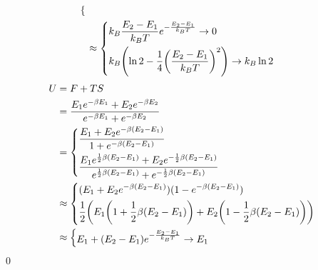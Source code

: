 \documentclass[uplatex,dvipdfmx,a4paper,11pt]{jlreq}
\makeatletter
\theoremstyle{definition}
\renewenvironment{proof}[1][\proofname]{\par
  \normalfont
  \topsep6\p@\@plus6\p@ \trivlist
  \item[\hskip\labelsep{\bfseries #1}\@addpunct{\bfseries}]\ignorespaces\quad\par
}{%
  \qed\endtrivlist\@endpefalse
}
\renewcommand\proofname{証明}
\makeatother
\begin{document}
\begin{proof}
\begin{align}
\begin{dcases}
    \end{dcases}                                                                                                                                                                                                                     \\
      & \approx
    \begin{dcases}
      k_B \frac{E_2 - E_1}{k_BT}e^{- \frac{E_2 - E_1}{k_BT}} \to 0            \\
      k_B\qty(\ln 2 - \frac{1}{4}\qty(\frac{E_2 - E_1}{k_BT})^2) \to k_B\ln 2 \\
    \end{dcases}
  \end{align}
  \begin{align}
    U & = F + TS                                                                                                                                                                                      \\
      & = \frac{E_1e^{-\beta E_1} + E_2e^{-\beta E_2}}{e^{-\beta E_1} + e^{-\beta E_2}}                                                                                                               \\
      & = \begin{dcases}
            \frac{E_1 + E_2e^{-\beta (E_2 - E_1)}}{1 + e^{-\beta (E_2 - E_1)}}                                                                                      \\
            \frac{E_1e^{\frac{1}{2}\beta (E_2 - E_1)} + E_2e^{-\frac{1}{2}\beta (E_2 - E_1)}}{e^{\frac{1}{2}\beta (E_2 - E_1)} + e^{-\frac{1}{2}\beta (E_2 - E_1)}} \\
          \end{dcases} \\
      & \approx \begin{dcases}
                  (E_1 + E_2e^{-\beta (E_2 - E_1)})(1 - e^{-\beta (E_2 - E_1)})                                          \\
                  \frac{1}{2}\qty(E_1\qty(1 + \frac{1}{2}\beta (E_2 - E_1)) + E_2\qty(1 - \frac{1}{2}\beta (E_2 - E_1))) \\
                \end{dcases}                                                                          \\
      & \approx \begin{dcases}
                  E_1 + (E_2 - E_1)e^{- \frac{E_2 - E_1}{k_BT}} \to E_1                                     \\

\end{dcases}
\end{align}
\end{proof}
\end{document}
